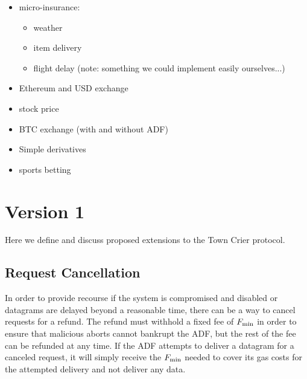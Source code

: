 \begin{itemize}
\item micro-insurance:
    \begin{itemize}
    \item weather
    \item item delivery
    \item flight delay (note: something we could implement easily ourselves...)
    \end{itemize}
\item Ethereum and USD exchange
\item stock price
\item BTC exchange (with and without ADF)
\item Simple derivatives
\item sports betting
\end{itemize}







\section{Version 1}

Here we define and discuss proposed extensions to the Town Crier protocol.

\subsection{Request Cancellation}

In order to provide recourse if the system is compromised and disabled or datagrams are delayed beyond a reasonable time,
there can be a way to cancel requests for a refund.
The refund must withhold a fixed fee of $F_{\rm min}$ in order to ensure that malicious aborts cannot bankrupt the ADF, but the rest of the fee can be refunded at any time.
If the ADF attempts to deliver a datagram for a canceled request, it will simply receive the $F_{\rm min}$ needed to cover its gas costs for the attempted delivery and not deliver any data.

